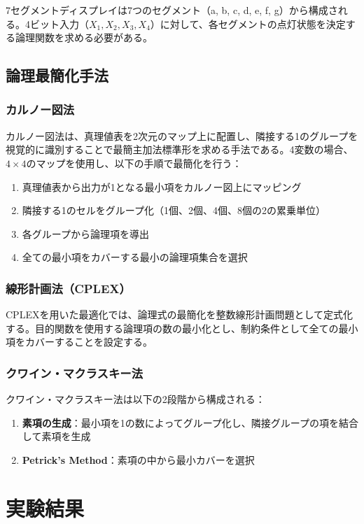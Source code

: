 \documentclass[a4j,dvipdfmx]{jsarticle}
\begin{document}
7セグメントディスプレイは7つのセグメント（a, b, c, d, e, f, g）から構成される。4ビット入力（$X_1, X_2, X_3, X_4$）に対して、各セグメントの点灯状態を決定する論理関数を求める必要がある。

\subsection{論理最簡化手法}

\subsubsection{カルノー図法}
カルノー図法は、真理値表を2次元のマップ上に配置し、隣接する1のグループを視覚的に識別することで最簡主加法標準形を求める手法である。4変数の場合、$4 \times 4$のマップを使用し、以下の手順で最簡化を行う：

\begin{enumerate}
\item 真理値表から出力が1となる最小項をカルノー図上にマッピング
\item 隣接する1のセルをグループ化（1個、2個、4個、8個の2の累乗単位）
\item 各グループから論理項を導出
\item 全ての最小項をカバーする最小の論理項集合を選択
\end{enumerate}

\subsubsection{線形計画法（CPLEX）}
CPLEXを用いた最適化では、論理式の最簡化を整数線形計画問題として定式化する。目的関数を使用する論理項の数の最小化とし、制約条件として全ての最小項をカバーすることを設定する。

\subsubsection{クワイン・マクラスキー法}
クワイン・マクラスキー法は以下の2段階から構成される：
\begin{enumerate}
\item \textbf{素項の生成}：最小項を1の数によってグループ化し、隣接グループの項を結合して素項を生成
\item \textbf{Petrick's Method}：素項の中から最小カバーを選択
\end{enumerate}

\section{実験結果}
\end{document}
